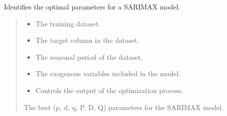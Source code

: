 \documentclass[letterpaper,10pt,english]{sphinxmanual}
\begin{document}

\begin{fulllineitems}
\label{\detokenize{docs/time_series_analysis:time_series_analysis.SARIMAX_optimizer}}
\pysigstartsignatures
{}
\pysigstopsignatures
\sphinxAtStartPar
Identifies the optimal parameters for a SARIMAX model.
\begin{quote}\begin{description}
\begin{itemize}
\item {} 
\sphinxAtStartPar
{} \textendash{} The training dataset.

\item {} 
\sphinxAtStartPar
{} \textendash{} The target column in the dataset.

\item {} 
\sphinxAtStartPar
{} \textendash{} The seasonal period of the dataset.

\item {} 
\sphinxAtStartPar
{} \textendash{} The exogenous variables included in the model.

\item {} 
\sphinxAtStartPar
{} \textendash{} Controls the output of the optimization process.

\end{itemize}

\sphinxAtStartPar
The best (p, d, q, P, D, Q) parameters for the SARIMAX model.

\end{description}\end{quote}

\end{fulllineitems}
\end{document}
